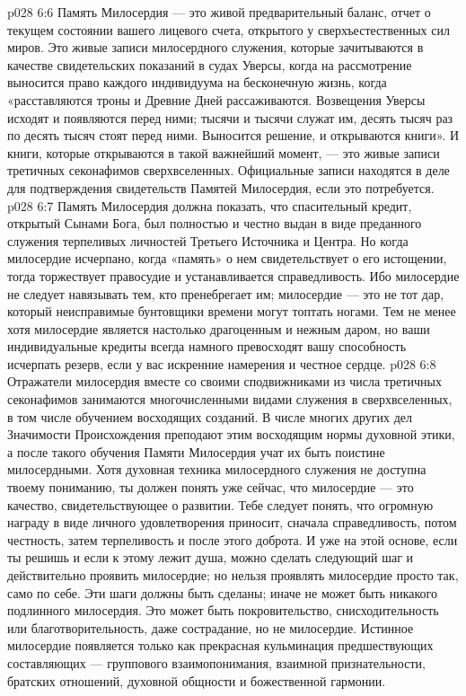 \vs p028 6:6 Память Милосердия --- это живой предварительный баланс, отчет о текущем состоянии вашего лицевого счета, открытого у сверхъестественных сил миров. Это живые записи милосердного служения, которые зачитываются в качестве свидетельских показаний в судах Уверсы, когда на рассмотрение выносится право каждого индивидуума на бесконечную жизнь, когда «расставляются троны и Древние Дней рассаживаются. Возвещения Уверсы исходят и появляются перед ними; тысячи и тысячи служат им, десять тысяч раз по десять тысяч стоят перед ними. Выносится решение, и открываются книги». И книги, которые открываются в такой важнейший момент, --- это живые записи третичных секонафимов сверхвселенных. Официальные записи находятся в деле для подтверждения свидетельств Памятей Милосердия, если это потребуется.
\vs p028 6:7 Память Милосердия должна показать, что спасительный кредит, открытый Сынами Бога, был полностью и честно выдан в виде преданного служения терпеливых личностей Третьего Источника и Центра. Но когда милосердие исчерпано, когда «память» о нем свидетельствует о его истощении, тогда торжествует правосудие и устанавливается справедливость. Ибо милосердие не следует навязывать тем, кто пренебрегает им; милосердие --- это не тот дар, который неисправимые бунтовщики времени могут топтать ногами. Тем не менее хотя милосердие является настолько драгоценным и нежным даром, но ваши индивидуальные кредиты всегда намного превосходят вашу способность исчерпать резерв, если у вас искренние намерения и честное сердце.
\vs p028 6:8 \pc Отражатели милосердия вместе со своими сподвижниками из числа третичных секонафимов занимаются многочисленными видами служения в сверхвселенных, в том числе обучением восходящих созданий. В числе многих других дел Значимости Происхождения преподают этим восходящим нормы духовной этики, а после такого обучения Памяти Милосердия учат их быть поистине милосердными. Хотя духовная техника милосердного служения не доступна твоему пониманию, ты должен понять уже сейчас, что милосердие --- это качество, свидетельствующее о развитии. Тебе следует понять, что огромную награду в виде личного удовлетворения приносит, сначала справедливость, потом честность, затем терпеливость и после этого доброта. И уже на этой основе, если ты решишь и если к этому лежит душа, можно сделать следующий шаг и действительно проявить милосердие; но нельзя проявлять милосердие просто так, само по себе. Эти шаги должны быть сделаны; иначе не может быть никакого подлинного милосердия. Это может быть покровительство, снисходительность или благотворительность, даже сострадание, но не милосердие. Истинное милосердие появляется только как прекрасная кульминация предшествующих составляющих --- группового взаимопонимания, взаимной признательности, братских отношений, духовной общности и божественной гармонии.
